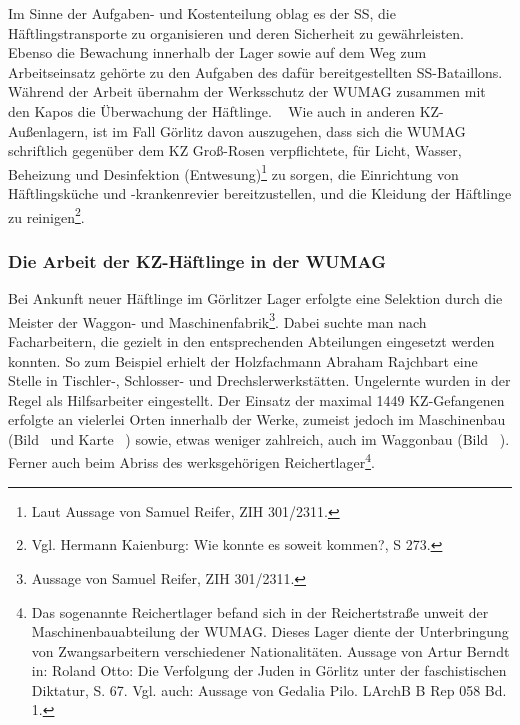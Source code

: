 Im Sinne der Aufgaben- und Kostenteilung oblag es der SS, die Häftlingstransporte zu organisieren und deren Sicherheit zu gewährleisten. Ebenso die Bewachung innerhalb der Lager sowie auf dem Weg zum Arbeitseinsatz gehörte zu den Aufgaben des dafür bereitgestellten SS-Bataillons. Während der Arbeit übernahm der Werksschutz der WUMAG zusammen mit den Kapos die Überwachung der Häftlinge.
~\newline
Wie auch in anderen KZ-Außenlagern, ist im Fall Görlitz davon auszugehen, dass sich die WUMAG schriftlich gegenüber dem KZ Groß-Rosen verpflichtete, für Licht, Wasser, Beheizung und Desinfektion (\glqq Entwesung\grqq)\footnote{Laut Aussage von Samuel Reifer, ZIH 301/2311.} zu sorgen, die Einrichtung von Häftlingsküche und -krankenrevier bereitzustellen, und die Kleidung der Häftlinge zu reinigen\footnote{Vgl. Hermann Kaienburg: Wie konnte es soweit kommen?, S 273.}.





\subsubsection{Die Arbeit der KZ-Häftlinge in der WUMAG}
Bei Ankunft neuer Häftlinge im Görlitzer Lager erfolgte eine Selektion durch die Meister der Waggon- und Maschinenfabrik\footnote{Aussage von Samuel Reifer, ZIH 301/2311.}. Dabei suchte man nach Facharbeitern, die gezielt in den entsprechenden Abteilungen eingesetzt werden konnten. So zum Beispiel erhielt der Holzfachmann Abraham Rajchbart eine Stelle in Tischler-, Schlosser- und Drechslerwerkstätten. Ungelernte wurden in der Regel als Hilfsarbeiter eingestellt.
\newline
Der Einsatz der maximal 1449 KZ-Gefangenen erfolgte an vielerlei Orten innerhalb der Werke, zumeist jedoch im Maschinenbau (Bild~ und Karte~ ) sowie, etwas weniger zahlreich, auch im Waggonbau (Bild ~). Ferner auch beim Abriss des werksgehörigen \glqq Reichertlager\grqq\footnote{Das sogenannte Reichertlager befand sich in der Reichertstraße unweit der Maschinenbauabteilung der WUMAG. Dieses Lager diente der Unterbringung von Zwangsarbeitern verschiedener Nationalitäten. Aussage von Artur Berndt in: Roland Otto: Die Verfolgung der Juden in Görlitz unter der faschistischen Diktatur, S. 67. Vgl. auch: Aussage von Gedalia Pilo. LArchB B Rep 058 Bd. 1.}.


